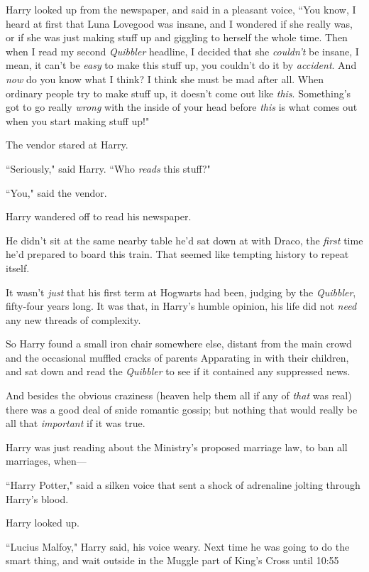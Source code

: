 Harry looked up from the newspaper, and said in a pleasant voice, ``You know, I heard at first that Luna Lovegood was insane, and I wondered if she really was, or if she was just making stuff up and giggling to herself the whole time. Then when I read my second \emph{Quibbler} headline, I decided that she \emph{couldn't} be insane, I mean, it can't be \emph{easy} to make this stuff up, you couldn't do it by \emph{accident}. And \emph{now} do you know what I think? I think she must be mad after all. When ordinary people try to make stuff up, it doesn't come out like \emph{this}. Something's got to go really \emph{wrong} with the inside of your head before \emph{this} is what comes out when you start making stuff up!"

The vendor stared at Harry.

``Seriously," said Harry. ``Who \emph{reads} this stuff?"

``You," said the vendor.

Harry wandered off to read his newspaper.

He didn't sit at the same nearby table he'd sat down at with Draco, the \emph{first} time he'd prepared to board this train. That seemed like tempting history to repeat itself.

It wasn't \emph{just} that his first term at Hogwarts had been, judging by the \emph{Quibbler}, fifty-four years long. It was that, in Harry's humble opinion, his life did not \emph{need} any new threads of complexity.

So Harry found a small iron chair somewhere else, distant from the main crowd and the occasional muffled cracks of parents Apparating in with their children, and sat down and read the \emph{Quibbler} to see if it contained any suppressed news.

And besides the obvious craziness (heaven help them all if any of \emph{that} was real) there was a good deal of snide romantic gossip; but nothing that would really be all that \emph{important} if it was true.

Harry was just reading about the Ministry's proposed marriage law, to ban all marriages, when—

``Harry Potter," said a silken voice that sent a shock of adrenaline jolting through Harry's blood.

Harry looked up.

``Lucius Malfoy," Harry said, his voice weary. Next time he was going to do the smart thing, and wait outside in the Muggle part of King's Cross until 10:55\am

